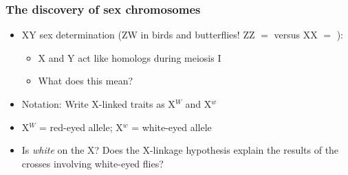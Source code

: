 \begin{frame}
    \frametitle{The discovery of sex chromosomes}
    \begin{itemize}[<+->]
        \item XY sex determination (ZW in birds and butterflies! ZZ $=$ \male
            versus XX $=$ \female):
            \begin{itemize}
                \item X and Y act like homologs during meiosis I
                \item What does this mean? 
            \end{itemize}

        \item Notation: Write X-linked traits as X$^W$ and X$^w$

            \vspace{4mm}
        \item X$^W$ = red-eyed allele; X$^w$ = white-eyed allele

            \vspace{4mm}
        \item Is \textit{white} on the X? Does the X-linkage hypothesis explain
            the results of the crosses involving white-eyed flies?
    \end{itemize}
\end{frame}


